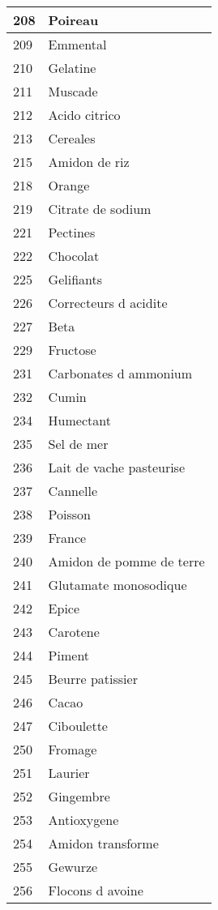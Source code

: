 \begin{longtable}{|l|l|}
208 & Poireau \\ \hline 
209 & Emmental \\ \hline 
210 & Gelatine \\ \hline 
211 & Muscade \\ \hline 
212 & Acido citrico \\ \hline 
213 & Cereales \\ \hline 
215 & Amidon de riz \\ \hline 
218 & Orange \\ \hline 
219 & Citrate de sodium \\ \hline 
221 & Pectines \\ \hline 
222 & Chocolat \\ \hline 
225 & Gelifiants \\ \hline 
226 & Correcteurs d acidite \\ \hline 
227 & Beta \\ \hline 
229 & Fructose \\ \hline 
231 & Carbonates d ammonium \\ \hline 
232 & Cumin \\ \hline 
234 & Humectant \\ \hline 
235 & Sel de mer \\ \hline 
236 & Lait de vache pasteurise \\ \hline 
237 & Cannelle \\ \hline 
238 & Poisson \\ \hline 
239 & France \\ \hline 
240 & Amidon de pomme de terre \\ \hline 
241 & Glutamate monosodique \\ \hline 
242 & Epice \\ \hline 
243 & Carotene \\ \hline 
244 & Piment \\ \hline 
245 & Beurre patissier \\ \hline 
246 & Cacao \\ \hline 
247 & Ciboulette \\ \hline 
250 & Fromage \\ \hline 
251 & Laurier \\ \hline 
252 & Gingembre \\ \hline 
253 & Antioxygene \\ \hline 
254 & Amidon transforme \\ \hline 
255 & Gewurze \\ \hline 
256 & Flocons d avoine \\ \hline 

\end{longtable}
